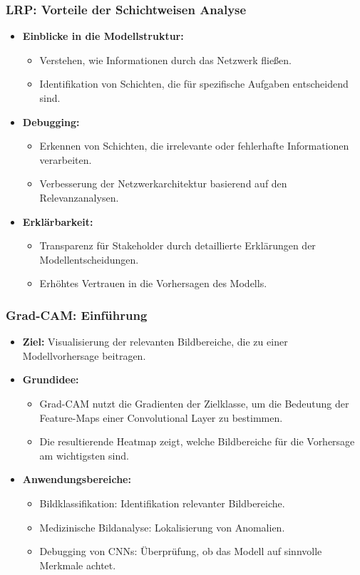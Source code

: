 \documentclass[aspectratio=1610, xcolor=dvipsnames, 9pt]{beamer}
\begin{document}
\begin{frame}
  \frametitle{LRP: Vorteile der Schichtweisen Analyse}
  \begin{itemize}
    \item \textbf{Einblicke in die Modellstruktur:}
    \begin{itemize}
      \item Verstehen, wie Informationen durch das Netzwerk fließen.
      \item Identifikation von Schichten, die für spezifische Aufgaben entscheidend sind.
    \end{itemize}
    \item \textbf{Debugging:}
    \begin{itemize}
      \item Erkennen von Schichten, die irrelevante oder fehlerhafte Informationen verarbeiten.
      \item Verbesserung der Netzwerkarchitektur basierend auf den Relevanzanalysen.
    \end{itemize}
    \item \textbf{Erklärbarkeit:}
    \begin{itemize}
      \item Transparenz für Stakeholder durch detaillierte Erklärungen der Modellentscheidungen.
      \item Erhöhtes Vertrauen in die Vorhersagen des Modells.
    \end{itemize}
  \end{itemize}
\end{frame}

\begin{frame}
  \frametitle{Grad-CAM: Einführung}
  \begin{itemize}
    \item \textbf{Ziel:} Visualisierung der relevanten Bildbereiche, die zu einer Modellvorhersage beitragen.
    \item \textbf{Grundidee:}
    \begin{itemize}
      \item Grad-CAM nutzt die Gradienten der Zielklasse, um die Bedeutung der Feature-Maps einer Convolutional Layer zu bestimmen.
      \item Die resultierende Heatmap zeigt, welche Bildbereiche für die Vorhersage am wichtigsten sind.
    \end{itemize}
    \item \textbf{Anwendungsbereiche:}
    \begin{itemize}
      \item Bildklassifikation: Identifikation relevanter Bildbereiche.
      \item Medizinische Bildanalyse: Lokalisierung von Anomalien.
      \item Debugging von CNNs: Überprüfung, ob das Modell auf sinnvolle Merkmale achtet.
    \end{itemize}
  \end{itemize}
\end{frame}
\end{document}
